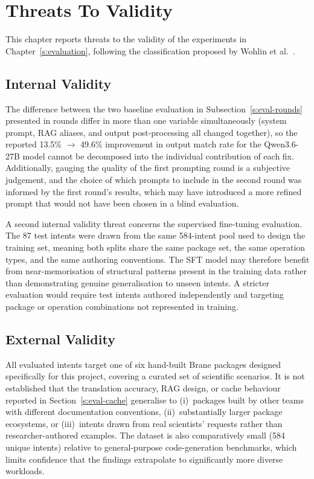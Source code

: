 \chapter{Threats To Validity}\label{sec:threats}

This chapter reports threats to the validity of the experiments in
Chapter~\ref{s:evaluation}, following the classification proposed by Wohlin
et al.~\cite{wohlin12}.

\section{Internal Validity}\label{sec:internal-validity}

The difference between the two baseline evaluation in Subsection~\ref{s:eval-rounds}
presented in rounds differ
in more than one variable simultaneously (system prompt, RAG aliases, and
output post-processing all changed together), so the reported 13.5\%
$\rightarrow$ 49.6\% improvement in output match rate for the Qwen3.6-27B model
cannot be decomposed into the individual contribution of each fix. Additionally, gauging the
quality of the first prompting round is a subjective judgement, and the choice of which prompts
to include in the second round was informed by the first round's results, which may have 
introduced a more refined prompt that would not have been chosen in a blind evaluation.

A second internal validity threat concerns the supervised fine-tuning evaluation.
The 87 test intents were drawn from the same 584-intent pool used to design
the training set, meaning both splits share the same package set, the same
operation types, and the same authoring conventions. The SFT model may
therefore benefit from near-memorisation of structural patterns present in
the training data rather than demonstrating genuine generalisation to unseen
intents. A stricter evaluation would require test intents authored
independently and targeting package or operation combinations not represented
in training.

\section{External Validity}

All evaluated intents target one of six hand-built Brane packages designed
specifically for this project, covering a curated set of scientific scenarios. 
It is not established that the translation accuracy, RAG design,
or cache behaviour reported in Section~\ref{s:eval-cache} generalise to (i)~packages built by other
teams with different documentation conventions, (ii)~substantially larger
package ecosystems, or (iii)~intents drawn from real scientists' requests
rather than researcher-authored examples. The dataset is also comparatively
small (584 unique intents) relative to general-purpose code-generation
benchmarks, which limits confidence that the findings extrapolate to
significantly more diverse workloads.

